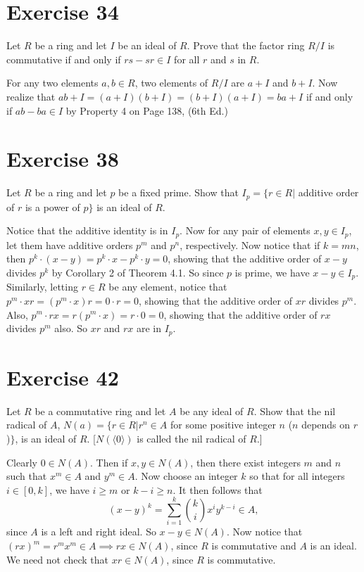 \documentclass[12pt]{article}
\begin{document}
\section*{Exercise 34}

Let $R$ be a ring and let $I$ be an ideal of $R$.  Prove that the
factor ring $R/I$ is commutative if and only if $rs-sr\in I$ for all $r$ and $s$ in $R$.

For any two elements $a,b\in R$, two elements of $R/I$ are $a+I$ and $b+I$.
Now realize that $ab+I=(a+I)(b+I)=(b+I)(a+I)=ba+I$ if and only if $ab-ba\in I$
by Property 4 on Page 138, (6th Ed.)

\section*{Exercise 38}

Let $R$ be a ring and let $p$ be a fixed prime.  Show that
$I_p=\{r\in R|$ additive order of $r$ is a power of $p\}$ is an
ideal of $R$.

Notice that the additive identity is in $I_p$.  Now for any pair
of elements $x,y\in I_p$, let them have additive orders $p^m$
and $p^n$, respectively.  Now notice that if $k=mn$,
then $p^k\cdot (x-y)=p^k\cdot x-p^k\cdot y=0$, showing
that the additive order of $x-y$ divides $p^k$ by Corollary 2
of Theorem 4.1.  So since $p$ is prime, we have $x-y\in I_p$.
Similarly, letting $r\in R$ be any element,
notice that $p^m\cdot xr=(p^m\cdot x)r=0\cdot r=0$,
showing that the additive order of $xr$ divides $p^m$.
Also, $p^m\cdot rx=r(p^m\cdot x)=r\cdot 0=0$, showing
that the additive order of $rx$ divides $p^m$ also.
So $xr$ and $rx$ are in $I_p$.

\section*{Exercise 42}

Let $R$ be a commutative ring and let $A$ be any ideal of $R$.
Show that the nil radical of $A$, $N(a)=\{r\in R|r^n\in A$ for some
positive integer $n$ ($n$ depends on $r$)$\}$, is an ideal of $R$.
[$N(\langle 0\rangle)$ is called the nil radical of $R$.]

Clearly $0\in N(A)$.  Then if $x,y\in N(A)$, then
there exist integers $m$ and $n$ such that $x^m\in A$
and $y^m\in A$.  Now choose an integer $k$ so that
for all integers $i\in[0,k]$, we have $i\geq m$ or $k-i\geq n$.
It then follows that
\begin{equation*}
(x-y)^k=\sum_{i=1}^k\binom{k}{i}x^iy^{k-i}\in A,
\end{equation*}
since $A$ is a left and right ideal.  So $x-y\in N(A)$.
Now notice that $(rx)^m=r^mx^m\in A\implies rx\in N(A)$,
since $R$ is commutative and $A$ is an ideal.
We need not check that $xr\in N(A)$, since $R$ is commutative.
\end{document}
